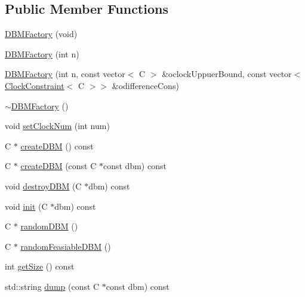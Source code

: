 \subsection*{Public Member Functions}
\begin{DoxyCompactItemize}
\item 
\mbox{\hyperlink{classgraphsat_1_1_d_b_m_factory_a9e1186bd6895316c221b836278ff8e67}{D\+B\+M\+Factory}} (void)
\item 
\mbox{\hyperlink{classgraphsat_1_1_d_b_m_factory_ad74660809aa5c24398bc51d4124bfc34}{D\+B\+M\+Factory}} (int n)
\item 
\mbox{\hyperlink{classgraphsat_1_1_d_b_m_factory_a92cb135d2bb3e22ba50de76107fdb8bd}{D\+B\+M\+Factory}} (int n, const vector$<$ C $>$ \&oclock\+Uppuer\+Bound, const vector$<$ \mbox{\hyperlink{classgraphsat_1_1_clock_constraint}{Clock\+Constraint}}$<$ C $>$$>$ \&odifference\+Cons)
\item 
\mbox{\hyperlink{classgraphsat_1_1_d_b_m_factory_af0f3dde87f07df5d3c9f0f3a1d754425}{$\sim$\+D\+B\+M\+Factory}} ()
\item 
void \mbox{\hyperlink{classgraphsat_1_1_d_b_m_factory_ab3c0c83274b0cda4d0899e529ada4138}{set\+Clock\+Num}} (int num)
\item 
C $\ast$ \mbox{\hyperlink{classgraphsat_1_1_d_b_m_factory_ac51eaa5ba3e4049b0de4ac8fe5950ca1}{create\+D\+BM}} () const
\item 
C $\ast$ \mbox{\hyperlink{classgraphsat_1_1_d_b_m_factory_a861184abac08ce37064083f653ab99cc}{create\+D\+BM}} (const C $\ast$const dbm) const
\item 
void \mbox{\hyperlink{classgraphsat_1_1_d_b_m_factory_a4495ff0e5a07519a5ea06d4eb0e16876}{destroy\+D\+BM}} (C $\ast$dbm) const
\item 
void \mbox{\hyperlink{classgraphsat_1_1_d_b_m_factory_aaeae7653989fa7e0fcb32d2f54eb1cc1}{init}} (C $\ast$dbm) const
\item 
C $\ast$ \mbox{\hyperlink{classgraphsat_1_1_d_b_m_factory_a4870799258dd6b425fec20603924ffb4}{random\+D\+BM}} ()
\item 
C $\ast$ \mbox{\hyperlink{classgraphsat_1_1_d_b_m_factory_a900f72a3876daf4cd4142a3704873025}{random\+Feasiable\+D\+BM}} ()
\item 
int \mbox{\hyperlink{classgraphsat_1_1_d_b_m_factory_aaecf26c5b4157fce85102a8759d9c435}{get\+Size}} () const
\item 
std\+::string \mbox{\hyperlink{classgraphsat_1_1_d_b_m_factory_a700e1338dda1ba25930938b8f130ab80}{dump}} (const C $\ast$const dbm) const
\item 
$$
\end{DoxyCompactItemize}
